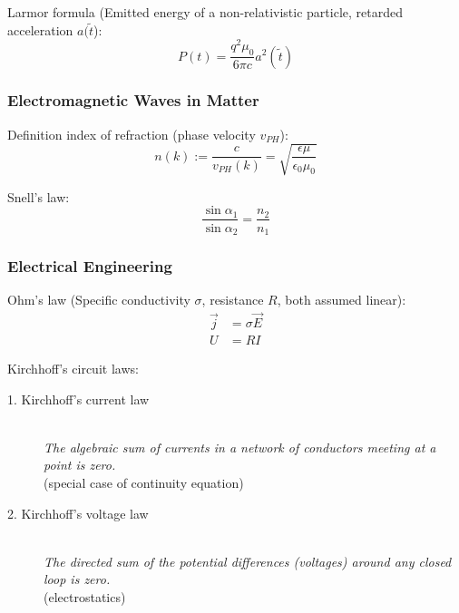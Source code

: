 			\noindent
			Larmor formula (Emitted energy of a non-relativistic particle, retarded acceleration $a(\tilde{t}$):
			\begin{equation}
				P(t) = \frac{q^2 \mu_0}{6\pi c}a^2(\tilde{t})
			\end{equation}

		\subsubsection{Electromagnetic Waves in Matter}
			\noindent
			Definition index of refraction (phase velocity $v_{PH}$):
			\begin{equation}
				n(k) := \frac{c}{v_{PH}(k)} = \sqrt{\frac{\epsilon\mu}{\epsilon_0\mu_0}}
			\end{equation}

			\noindent
			Snell's law:
			\begin{equation}
				\frac{\sin\alpha_1}{\sin\alpha_2} = \frac{n_2}{n_1}
			\end{equation}



		\subsubsection{Electrical Engineering}
			\noindent
			Ohm's law (Specific conductivity $\sigma$, resistance $R$, both assumed linear):
			\begin{equation}
				\begin{aligned}
					\vec{j} &= \sigma\vec{E} \\
					U &= R I
				\end{aligned}
			\end{equation}

			\noindent
			Kirchhoff's circuit laws:
			\begin{description}
				\item[1. Kirchhoff's current law] \hfill \\
					{\textit{The algebraic sum of currents in a network of conductors meeting at a point is zero.} \\(special case of continuity equation)}
				\item[2. Kirchhoff's voltage law] \hfill \\
					{\textit{The directed sum of the potential differences (voltages) around any closed loop is zero.} \\(electrostatics)}
			\end{description}

